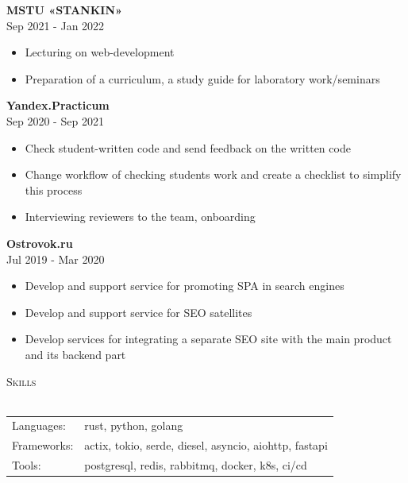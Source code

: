 \documentclass[a4paper]{article}
\newcommand{\lineunder} {
    \vspace*{-8pt} \\
    \hspace*{-18pt} \hrulefill \\
}
\newcommand{\header} [1] {
    {\hspace*{-18pt}\vspace*{6pt} \textsc{#1}}
    \vspace*{-6pt} \lineunder
}
\begin{document}
\textbf{MSTU «STANKIN»} \\
 \hfill Sep 2021 - Jan 2022\\
\vspace{-1mm}
\begin{itemize} \itemsep -1pt
	\item Lecturing on web-development
	\item Preparation of a curriculum, a study guide for laboratory work/seminars
\end{itemize}

\textbf{Yandex.Practicum} \\
 \hfill Sep 2020 - Sep 2021\\
\vspace{-1mm}
\begin{itemize} \itemsep -1pt
	\item Check student-written code and send feedback on the written code
	\item Change workflow of checking student\textquotesingle{}s work and create a checklist to simplify this process
	\item Interviewing reviewers to the team, onboarding
\end{itemize}

\textbf{Ostrovok.ru} \\
 \hfill Jul 2019 - Mar 2020\\
\vspace{-1mm}
\begin{itemize} \itemsep -1pt
	\item Develop and support service for promoting SPA in search engines
	\item Develop and support service for SEO satellites
	\item Develop services for integrating a separate SEO site with the main product and its backend part
\end{itemize}

\header{Skills}
\begin{tabular}{ l l }
	Languages:  & rust, python, golang \\
	Frameworks: & actix, tokio, serde, diesel, asyncio, aiohttp, fastapi \\
    Tools:      & postgresql, redis, rabbitmq, docker, k8s, ci/cd \\
\end{tabular}
\vspace{2mm}
\end{document}

